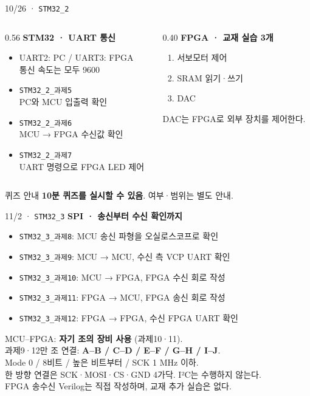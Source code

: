 \documentclass[aspectratio=43,11pt,t]{beamer}
\newcommand{\lab}[1]{\texttt{STM32\_#1}}
\newcommand{\task}[2]{\texttt{STM32\_#1\_과제#2}}
\begin{document}
\begin{frame}{10/26 · \lab{2}}
\fontsize{10}{13}\selectfont
\begin{columns}[T]
\begin{column}{0.56\textwidth}
\textbf{\color{UOSBlue}STM32 · UART 통신}
\begin{itemize}\setlength{\itemsep}{0.12cm}
\item UART2: PC / UART3: FPGA\\통신 속도는 모두 9600
\item \task{2}{5}\\PC와 MCU 입출력 확인
\item \task{2}{6}\\MCU → FPGA 수신값 확인
\item \task{2}{7}\\UART 명령으로 FPGA LED 제어
\end{itemize}
\end{column}
\begin{column}{0.40\textwidth}
\textbf{\color{UOSBlue}FPGA · 교재 실습 3개}
\begin{enumerate}\setlength{\itemsep}{0.15cm}
\item 서보모터 제어
\item SRAM 읽기·쓰기
\item DAC
\end{enumerate}
\small DAC는 FPGA로 외부 장치를 제어한다.
\end{column}
\end{columns}
\vspace{0.10cm}
\begin{block}{퀴즈 안내}
\small\textbf{10분 퀴즈를 실시할 수 있음}. 여부·범위는 별도 안내.
\end{block}
\end{frame}

\begin{frame}{11/2 · \lab{3}}
\textbf{\color{UOSBlue}SPI · 송신부터 수신 확인까지}
\begin{itemize}\setlength{\itemsep}{0.12cm}
\item \task{3}{8}: MCU 송신 파형을 오실로스코프로 확인
\item \task{3}{9}: MCU → MCU, 수신 측 VCP UART 확인
\item \task{3}{10}: MCU → FPGA, FPGA 수신 회로 작성
\item \task{3}{11}: FPGA → MCU, FPGA 송신 회로 작성
\item \task{3}{12}: FPGA → FPGA, 수신 FPGA UART 확인
\end{itemize}
\vspace{0.10cm}
\small
MCU--FPGA: \textbf{자기 조의 장비 사용} (과제10·11).\\
과제9·12만 조 연결: \textbf{A--B / C--D / E--F / G--H / I--J}.\\
Mode 0 / 8비트 / 높은 비트부터 / SCK 1 MHz 이하.\\
한 방향 연결은 SCK·MOSI·CS·GND 4가닥. I²C는 수행하지 않는다.\\
FPGA 송수신 Verilog는 직접 작성하며, 교재 추가 실습은 없다.
\end{frame}
\end{document}
